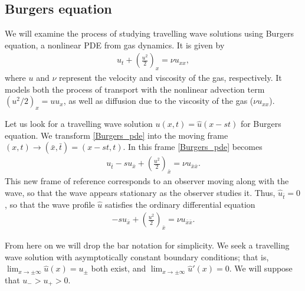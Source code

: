 \subsection{Burgers equation}
We will examine the process of studying travelling wave solutions using Burgers equation, a nonlinear PDE from gas dynamics. It is given by
\begin{align}
	u_t + \left( \frac{u^2}{2} \right)_x = \nu u_{xx}, \label{Burgers_pde}
\end{align}
where $u$ and $\nu$ represent the velocity and viscosity of the gas, respectively. It models both the process of transport with the nonlinear advection term $(u^2/2)_x = u u_x$, as well as diffusion due to the viscosity of the 
gas ($\nu u_{xx}$).

Let us look for a travelling wave solution $u(x,t) = \hat{u}(x-st)$ for Burgers equation. 
We transform \eqref{Burgers_pde} into the moving frame $(x,t) \to (\bar{x},\bar{t}) = (x-st, t)$. In this frame \eqref{Burgers_pde} becomes 
\begin{align}
	u_{\bar{t}} -su_{\bar{x}}+ \left( \frac{u^2}{2} \right)_{\bar{x}} = \nu u_{\bar{x}\bar{x}}. \label{Burgers_pde_moving frame}
\end{align}
This new frame of reference corresponds to an observer moving along with the wave, so that the wave appears stationary as the observer studies it.  Thus, $\hat{u}_{\bar{t}} = 0$, so that the wave profile 
$\hat{u}$ satisfies the ordinary differential equation 
\begin{align}
	 -su_{\bar{x}}+ \left( \frac{u^2}{2} \right)_{\bar{x}} = \nu u_{\bar{x}\bar{x}}. \label{Burgers_ode}
\end{align}

From here on we will drop the bar notation for simplicity. We seek a travelling wave solution with asymptotically constant boundary conditions; that is,  $\lim_{x \to \pm \infty}\hat{u}(x) = u_{\pm}$
both exist, and  $\lim_{x \to \pm \infty} \hat{u}'(x) = 0$. We will suppose that $u_- > u_+ > 0$.


